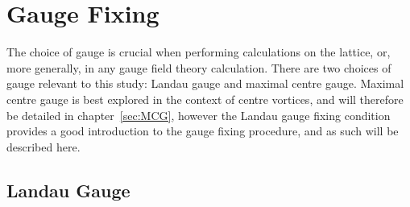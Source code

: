 \section{Gauge Fixing}
The choice of gauge is crucial when performing calculations on the lattice, or, more generally, in any gauge field theory calculation. There are two choices of gauge relevant to this study: Landau gauge and maximal centre gauge. Maximal centre gauge is best explored in the context of centre vortices, and will therefore be detailed in chapter~\ref{sec:MCG}, however the Landau gauge fixing condition provides a good introduction to the gauge fixing procedure, and as such will be described here.

\subsection{Landau Gauge}\label{sec:LandauGauge}

